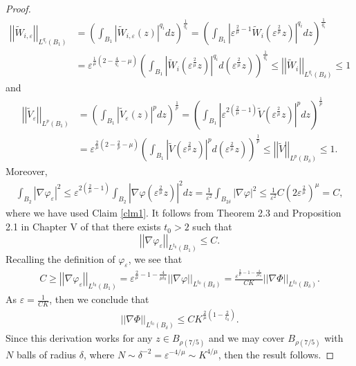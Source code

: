 \documentclass[12pt,reqno]{amsart}
\theoremstyle{plain}
\theoremstyle{definition}
\newcommand{\eps}{\varepsilon}
\newcommand{\vp}{\varphi}
\newcommand{\de}{\delta}
\newcommand{\gr}{\nabla}
\newcommand{\norm}[1]{\left\vert \left\vert #1\right\vert\right\vert}
\newcommand{\abs}[1]{\left\vert#1\right\vert}
\newcommand{\pr}[1]{\left( #1 \right) }
\begin{document}
\begin{proof}
\begin{align*}
\norm{\widetilde W_{i,\eps}}_{L^{q_i}\pr{B_1}}
&= \pr{\int_{B_1} \abs{\widetilde W_{i,\eps}\pr{z}}^{q_i} dz}^{\frac 1 {q_i}}
= \pr{\int_{B_1} \abs{\eps^{\frac 2 \mu -1} \widetilde W_i\pr{\eps^{\frac 2 \mu} z} }^{q_i} dz}^{\frac 1 {q_i}} \\
&=\eps^{\frac 1 \mu \pr{2-\frac 4 {q_i} - \mu} } \pr{\int_{B_1} \abs{ \widetilde W_i\pr{\eps^{\frac 2 \mu} z} }^{q_i} d\pr{\eps^{\frac 2 \mu} z} }^{\frac 1 {q_i}}
\le \norm{\widetilde W_i}_{L^{q_i}\pr{B_{\de}}} 
\le 1
\end{align*}
and
\begin{align*}
\norm{\widetilde V_\eps}_{L^p\pr{B_1}}
&= \pr{\int_{B_1} \abs{\widetilde V_\eps\pr{z}}^p dz}^{\frac 1 p}
= \pr{\int_{B_1} \abs{\eps^{2\pr{\frac 2 \mu -1}} \widetilde V\pr{\eps^{\frac 2 \mu} z} }^p dz}^{\frac 1 p} \\
&=\eps^{\frac 2 \mu \pr{2-\frac 2 p - \mu} } \pr{\int_{B_1} \abs{ \widetilde V\pr{\eps^{\frac 2 \mu} z} }^p d\pr{\eps^{\frac 2 \mu} z} }^{\frac 1 p}
\le \norm{\widetilde V}_{L^p\pr{B_{\de}}} 
\le 1.
\end{align*}
Moreover,
\begin{align*}
\int_{B_2} \abs{\gr \vp_\eps}^2 
\le \eps^{2\pr{\frac 2 \mu -1}} \int_{B_{2}}\abs{\gr \vp\pr{\eps^{\frac 2 \mu} z}}^2 dz
= \frac{1}{\eps^2} \int_{B_{2\de}} \abs{\gr \vp}^2
\le \frac{1}{\eps^2} C \pr{2\eps^{\frac 2 \mu}}^{\mu} = C,
\end{align*}
where we have used Claim \ref{clm1}.
It follows from Theorem 2.3 and Proposition 2.1 in Chapter V of \cite{Gi83} that there exists $t_0 > 2$ such that
\begin{equation}
\norm{\gr \vp_\eps}_{L^{t_0}\pr{B_1}} \le C.
\label{GiaBd}
\end{equation}
Recalling the definition of $\vp_\eps$, we see that
\begin{align*}
C \ge \norm{\gr \vp_\eps}_{L^{t_0}\pr{B_{1}}} 
= \eps^{\frac 2 \mu - 1 - \frac 4 {\mu t_0}} \norm{\gr \vp}_{L^{t_0}\pr{B_{\de}}}
= \frac{\eps^{\frac 2 \mu - 1 - \frac 4 {\mu t_0}}}{C K} \norm{\gr \Phi}_{L^{t_0}\pr{B_{\de}}}.
\end{align*}
As $\eps = \frac{1}{C K}$, then we conclude that
\begin{align*}
 \norm{\gr \Phi}_{L^{t_0}\pr{B_{ \de}}}
\le C K^{\frac 2 \mu\pr{1 - \frac 2 {t_0}}}.
\end{align*}
Since this derivation works for any $z \in B_{\rho\pr{7/5}}$ and we may cover $B_{\rho\pr{7/5}}$ with $N$ balls of radius $\de$, where $N \sim \de^{-2} = \eps^{-4/\mu} \sim K^{4/\mu}$, then the result follows.
\end{proof}
\end{document}
